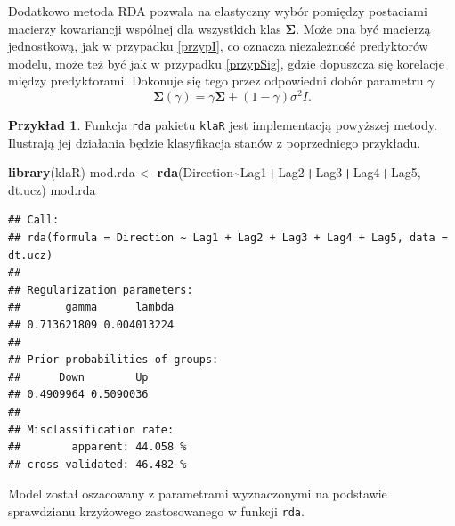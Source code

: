 \documentclass[
]{book}
\newenvironment{Shaded}{\begin{snugshade}}{\end{snugshade}}
\newcommand{\AttributeTok}[1]{\textcolor[rgb]{0.13,0.29,0.53}{#1}}
\newcommand{\FunctionTok}[1]{\textcolor[rgb]{0.13,0.29,0.53}{\textbf{#1}}}
\newcommand{\NormalTok}[1]{#1}
\newcommand{\OtherTok}[1]{\textcolor[rgb]{0.56,0.35,0.01}{#1}}
\newcommand{\SpecialCharTok}[1]{\textcolor[rgb]{0.81,0.36,0.00}{\textbf{#1}}}
\theoremstyle{plain}
\theoremstyle{definition}
\theoremstyle{definition}
\theoremstyle{definition}
\newtheorem{example}{Przykład}[chapter]
\theoremstyle{definition}
\theoremstyle{definition}
\theoremstyle{remark}
\begin{document}
Dodatkowo metoda RDA pozwala na elastyczny wybór pomiędzy postaciami macierzy kowariancji wspólnej dla wszystkich klas \(\boldsymbol\Sigma\). Może ona być macierzą jednostkową, jak w przypadku \ref{przypI}, co oznacza niezależność predyktorów modelu, może też być jak w przypadku \ref{przypSig}, gdzie dopuszcza się korelacje między predyktorami. Dokonuje się tego przez odpowiedni dobór parametru \(\gamma\)
\begin{equation}
    \boldsymbol \Sigma(\gamma) = \gamma\boldsymbol \Sigma+(1-\gamma)\sigma^2I.
\end{equation}

\begin{example}
\protect\hypertarget{exm:rda}{}\label{exm:rda}Funkcja \texttt{rda} pakietu \texttt{klaR} jest implementacją powyższej metody. Ilustrają jej działania będzie klasyfikacja stanów z poprzedniego przykładu.
\end{example}

\begin{Shaded}
\begin{Highlighting}[]
\FunctionTok{library}\NormalTok{(klaR)}
\NormalTok{mod.rda }\OtherTok{\textless{}{-}} \FunctionTok{rda}\NormalTok{(Direction}\SpecialCharTok{\textasciitilde{}}\NormalTok{Lag1}\SpecialCharTok{+}\NormalTok{Lag2}\SpecialCharTok{+}\NormalTok{Lag3}\SpecialCharTok{+}\NormalTok{Lag4}\SpecialCharTok{+}\NormalTok{Lag5, dt.ucz)}
\NormalTok{mod.rda}
\end{Highlighting}
\end{Shaded}

\begin{verbatim}
## Call: 
## rda(formula = Direction ~ Lag1 + Lag2 + Lag3 + Lag4 + Lag5, data = dt.ucz)
## 
## Regularization parameters: 
##       gamma      lambda 
## 0.713621809 0.004013224 
## 
## Prior probabilities of groups: 
##      Down        Up 
## 0.4909964 0.5090036 
## 
## Misclassification rate: 
##        apparent: 44.058 %
## cross-validated: 46.482 %
\end{verbatim}

Model został oszacowany z parametrami wyznaczonymi na podstawie sprawdzianu krzyżowego zastosowanego w funkcji \texttt{rda}.

\begin{Shaded}
\end{Shaded}
\end{document}

